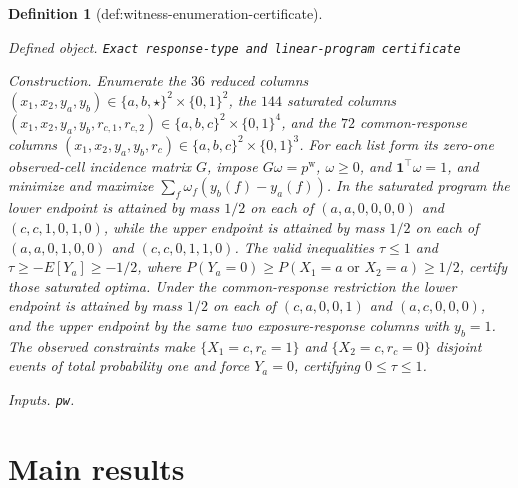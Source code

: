 \documentclass{article}
\newtheorem{definition}{Definition}
\begin{document}
\begin{definition}[def:witness-enumeration-certificate]\label{def:witness-enumeration-certificate}
\par\smallskip\noindent\emph{Defined object.} \texttt{Exact response-\allowbreak{}type and linear-\allowbreak{}program certificate}
\par\smallskip\noindent\emph{Construction.} Enumerate the \(36\) reduced columns \( (x_1,x_2,y_a,y_b)\in\{a,b,\star\}^2\times\{0,1\}^2\), the \(144\) saturated columns \( (x_1,x_2,y_a,y_b,r_{c,1},r_{c,2})\in\{a,b,c\}^2\times\{0,1\}^4\), and the \(72\) common-response columns \( (x_1,x_2,y_a,y_b,r_c)\in\{a,b,c\}^2\times\{0,1\}^3\). For each list form its zero-one observed-cell incidence matrix \(G\), impose \(G\omega=p^{\mathrm w}\), \(\omega\ge0\), and \(\mathbf 1^\top\omega=1\), and minimize and maximize \(\sum_f\omega_f(y_b(f)-y_a(f))\). In the saturated program the lower endpoint is attained by mass \(1/2\) on each of \((a,a,0,0,0,0)\) and \((c,c,1,0,1,0)\), while the upper endpoint is attained by mass \(1/2\) on each of \((a,a,0,1,0,0)\) and \((c,c,0,1,1,0)\). The valid inequalities \(\tau\le1\) and \(\tau\ge-E[Y_a]\ge-1/2\), where \(P(Y_a=0)\ge P(X_1=a\text{ or }X_2=a)\ge1/2\), certify those saturated optima. Under the common-response restriction the lower endpoint is attained by mass \(1/2\) on each of \((c,a,0,0,1)\) and \((a,c,0,0,0)\), and the upper endpoint by the same two exposure-response columns with \(y_b=1\). The observed constraints make \(\{X_1=c,r_c=1\}\) and \(\{X_2=c,r_c=0\}\) disjoint events of total probability one and force \(Y_a=0\), certifying \(0\le\tau\le1\).
\par\smallskip\noindent\emph{Inputs.} \texttt{pw}.
\end{definition}

\section{Main results}
\end{document}
